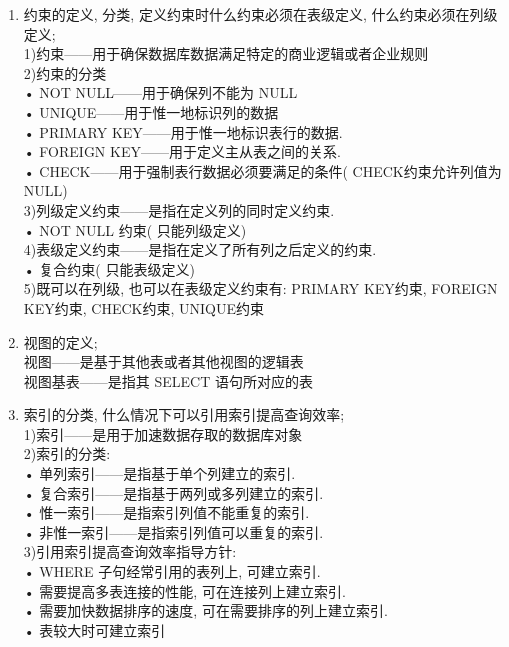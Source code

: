 \documentclass{article}                     %
\numberwithin{equation}{section}            %
\numberwithin{figure}{section}              %
\numberwithin{table}{section}               %
\begin{document}
\begin{enumerate}
\item 约束的定义, 分类, 定义约束时什么约束必须在表级定义, 什么约束必须在列级定义; \\
1)约束——用于确保数据库数据满足特定的商业逻辑或者企业规则\\
2)约束的分类\\
• NOT NULL——用于确保列不能为 NULL\\
• UNIQUE——用于惟一地标识列的数据\\
• PRIMARY KEY——用于惟一地标识表行的数据. \\
• FOREIGN KEY——用于定义主从表之间的关系. \\
• CHECK——用于强制表行数据必须要满足的条件( CHECK约束允许列值为NULL) \\
3)列级定义约束——是指在定义列的同时定义约束. \\
• NOT NULL 约束( 只能列级定义) \\
4)表级定义约束——是指在定义了所有列之后定义的约束. \\
• 复合约束( 只能表级定义) \\
5)既可以在列级, 也可以在表级定义约束有: PRIMARY KEY约束, FOREIGN KEY约束, CHECK约束,  UNIQUE约束\\


\item 视图的定义; \\
视图——是基于其他表或者其他视图的逻辑表\\
视图基表——是指其 SELECT 语句所对应的表\\



\item 索引的分类, 什么情况下可以引用索引提高查询效率; \\
1)索引——是用于加速数据存取的数据库对象\\
2)索引的分类: \\
• 单列索引——是指基于单个列建立的索引. \\
• 复合索引——是指基于两列或多列建立的索引. \\
• 惟一索引——是指索引列值不能重复的索引. \\
• 非惟一索引——是指索引列值可以重复的索引. \\
3)引用索引提高查询效率指导方针: \\
•  WHERE 子句经常引用的表列上, 可建立索引. \\
• 需要提高多表连接的性能, 可在连接列上建立索引. \\
• 需要加快数据排序的速度, 可在需要排序的列上建立索引. \\
• 表较大时可建立索引\\




\end{enumerate}
\end{document}
